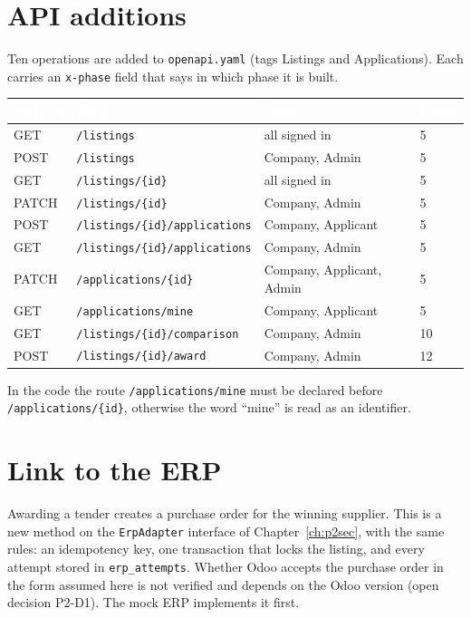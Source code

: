 \documentclass[11pt,a4paper]{report}
\newcommand{\hdr}[1]{\textcolor{white}{\sffamily\bfseries #1}}
\newcommand{\tblstart}{\rowcolors{2}{white}{rowgray}\arrayrulecolor{teal!60}}
\newcommand{\hdrrow}{\rowcolor{navy}}
\begin{document}
\section{API additions}
Ten operations are added to \texttt{openapi.yaml} (tags Listings and Applications). Each carries an \texttt{x-phase} field that says in which phase it is built.
{\tblstart\small
\begin{longtable}{L{1.5cm}L{5.2cm}L{3.2cm}L{1.6cm}}
\hdrrow \hdr{Method} & \hdr{Path} & \hdr{Roles} & \hdr{Phase}\\ \endhead
GET & \texttt{/listings} & all signed in & 5\\
POST & \texttt{/listings} & Company, Admin & 5\\
GET & \texttt{/listings/\{id\}} & all signed in & 5\\
PATCH & \texttt{/listings/\{id\}} & Company, Admin & 5\\
POST & \texttt{/listings/\{id\}/applications} & Company, Applicant & 5\\
GET & \texttt{/listings/\{id\}/applications} & Company, Admin & 5\\
PATCH & \texttt{/applications/\{id\}} & Company, Applicant, Admin & 5\\
GET & \texttt{/applications/mine} & Company, Applicant & 5\\
GET & \texttt{/listings/\{id\}/comparison} & Company, Admin & 10\\
POST & \texttt{/listings/\{id\}/award} & Company, Admin & 12\\
\hline
\end{longtable}}
In the code the route \texttt{/applications/mine} must be declared before \texttt{/applications/\{id\}}, otherwise the word ``mine'' is read as an identifier.

\section{Link to the ERP}
Awarding a tender creates a purchase order for the winning supplier. This is a new method on the \texttt{ErpAdapter} interface of Chapter~\ref{ch:p2sec}, with the same rules: an idempotency key, one transaction that locks the listing, and every attempt stored in \texttt{erp\_attempts}. Whether Odoo accepts the purchase order in the form assumed here is not verified and depends on the Odoo version (open decision P2-D1). The mock ERP implements it first.

\clearpage
\end{document}
